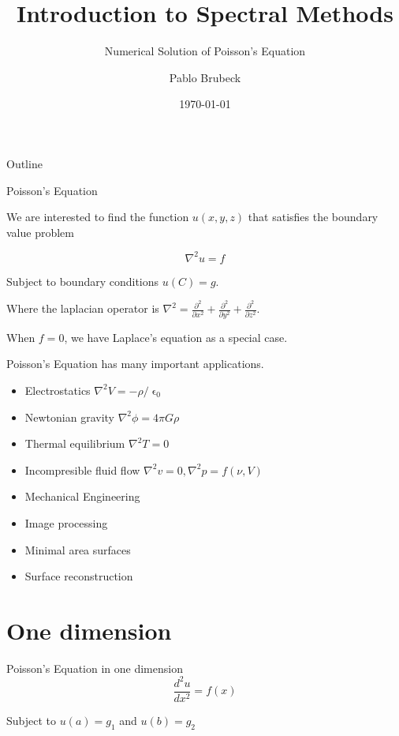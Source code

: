 \documentclass{beamer}
\title{Introduction to Spectral Methods}
\subtitle{Numerical Solution of Poisson's Equation}
\author{Pablo Brubeck\inst{1}}
\institute[ITESM]
{
  \inst{1}%
  Department of Physics\\
  Tecnologico de Monterrey
}
\date{\today}
\begin{document}
\begin{frame}
	\titlepage
\end{frame}

\begin{frame}{Outline}
	\tableofcontents
\end{frame}



\begin{frame}{Poisson's Equation}{}

We are interested to find the function $u(x,y,z)$ that satisfies the boundary value problem

\begin{equation*}
\nabla^2 u = f
\end{equation*}

Subject to boundary conditions $u(C)=g$.

\bigskip
Where the laplacian operator is $\nabla^2=\frac{\partial^2}{\partial x^2}+\frac{\partial^2}{\partial y^2}+\frac{\partial^2}{\partial z^2}$.

\bigskip
When $f=0$, we have Laplace's equation as a special case.
\end{frame}


\begin{frame}{Poisson's Equation has many important applications.}{}
\begin{itemize}
\item Electrostatics $\nabla^2 V = - \rho/\upvarepsilon_0$
\item Newtonian gravity $\nabla^2 \phi = 4\pi G\rho$
\item Thermal equilibrium $\nabla^2 T = 0$
\item Incompresible fluid flow $\nabla^2 v = 0, \nabla^2 p = f(\nu,V)$
\item Mechanical Engineering 
\item Image processing
\item Minimal area surfaces
\item Surface reconstruction
\end{itemize}

\end{frame}


\section{One dimension}
\begin{frame}{Poisson's Equation in one dimension}{}
\begin{equation*}
\frac{d^2u}{dx^2}=f(x)
\end{equation*}

Subject to $u(a)=g_1$ and  $u(b)=g_2$
\end{frame}
\end{document}

